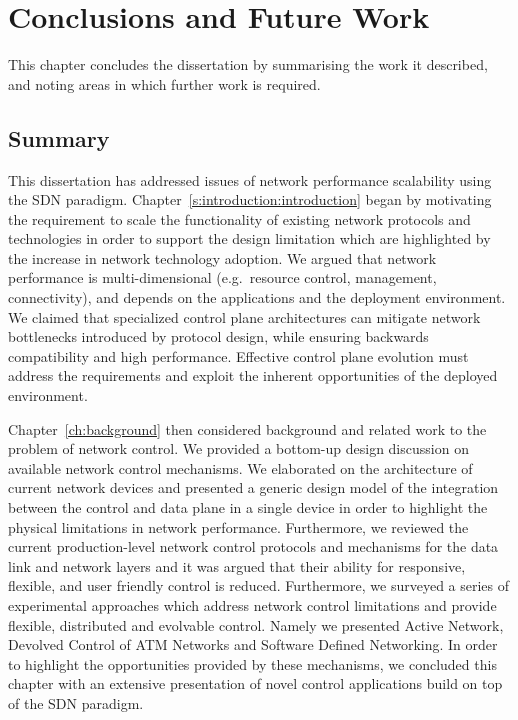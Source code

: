 \def\baselinestretch{1}
\chapter{Conclusions and Future Work} \label{sec:conclusions}

\def\baselinestretch{1.66}

This chapter concludes the dissertation by summarising the work it described,
and noting areas in which further work is required.

\section{Summary}

This dissertation has addressed issues of network performance scalability using
the SDN paradigm.  Chapter~\ref{s:introduction:introduction} began by
motivating the requirement to scale the functionality of existing network
protocols and technologies in order to support the design limitation which are
highlighted by the increase in network technology adoption.  We argued that
network performance is multi-dimensional (e.g.~resource control, management,
connectivity), and depends on the applications and the deployment environment.
We claimed that specialized control plane architectures can mitigate network
bottlenecks introduced by protocol design, while ensuring backwards
compatibility and high performance. Effective control plane evolution must
address the requirements and exploit the inherent opportunities of the deployed
environment. 

Chapter~\ref{ch:background} then considered background and related work to the
problem of network control. We provided a bottom-up design discussion on
available network control mechanisms. We elaborated on the architecture of
current network devices and presented a generic design model of the integration
between the control and data plane in a single device in order to highlight the
physical limitations in  network performance. Furthermore, we reviewed
the current production-level network control protocols and mechanisms for the
data link and network layers and it was argued that their ability for responsive,
flexible, and user friendly control is reduced. Furthermore, we surveyed a
series of experimental approaches which address network control limitations and
provide flexible, distributed and evolvable control.  Namely we presented Active
Network, Devolved Control of ATM Networks and Software Defined Networking. In
order to highlight the opportunities provided by these mechanisms, we concluded
this chapter with an extensive presentation of novel control applications build
on top of the SDN paradigm. 

